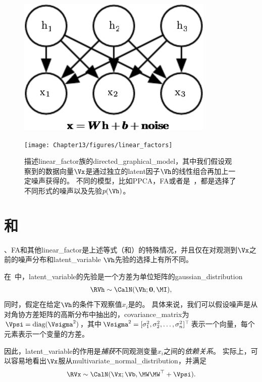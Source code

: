 \begin{figure}[!htb]
\ifOpenSource
\centerline{\includegraphics[scale=0.5]{images/115.png}}
\else
	\centerline{\texttt{[image: Chapter13/figures/linear\_factors]}}
\fi
\caption{描述\gls{linear_factor}族的\gls{directed_graphical_model}，其中我们假设观察到的数据向量$\Vx$是通过独立的\gls{latent}因子$\Vh$的线性组合再加上一定噪声获得的。
不同的模型，比如\gls{PPCA}，\gls{FA}或者是~，都是选择了不同形式的噪声以及先验$p(\Vh)$。}
\label{fig:linear_factors}
\end{figure}


\section{和}
\label{sec:probabilistic_PCA_and_factor_analysis}

、\gls{FA}和其他\gls{linear_factor}是上述等式（和）的特殊情况，并且仅在对观测到$\Vx$之前的噪声分布和\gls{latent_variable} $\Vh$先验的选择上有所不同。

在~\citep{Bartholomew-1987,Basilevsky94}中，\gls{latent_variable}的先验是一个方差为单位矩阵的\gls{gaussian_distribution}
\begin{align}
\label{eqn:133}
\RVh \sim \CalN(\Vh; \mathbf{0},\MI),
\end{align}
同时，假定在给定$\Vh$的条件下观察值$x_i$是的。
具体来说，我们可以假设噪声是从对角协方差矩阵的高斯分布中抽出的，\gls{covariance_matrix}为$\Vpsi = \text{diag}(\Vsigma^2)$，其中$\Vsigma^2 = [\sigma_1^2,\sigma_2^2,\ldots,\sigma_n^2]^{\top}$表示一个向量，每个元素表示一个变量的方差。


因此，\gls{latent_variable}的作用是\emph{捕获}不同观测变量$x_i$之间的\emph{依赖关系}。
实际上，可以容易地看出$\Vx$服从\gls{multivariate_normal_distribution}，并满足
\begin{align}
\label{eqn:134}
\RVx \sim \CalN(\Vx; \Vb, \MW\MW^{\top}+\Vpsi).
\end{align}



